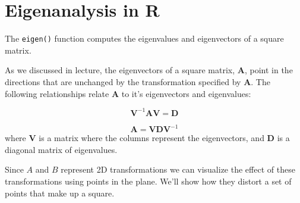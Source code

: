 \section{Eigenanalysis in R}

The \lstinline!eigen()! function computes the eigenvalues and
eigenvectors of a square matrix.

As we discussed in lecture, the eigenvectors of a square matrix,
$$, point in the directions that are unchanged by the
transformation specified by $$. The following relationships
relate $$ to it's eigenvectors and eigenvalues:

\[\mathbf{V}^{-1}\mathbf{A}\mathbf{V}  =  \mathbf{D} \]

\[\mathbf{A}  =  \mathbf{V}\mathbf{D}\mathbf{V}^{-1}\]
%
where $$ is a matrix where the columns represent the eigenvectors, and $$ is a diagonal matrix of eigenvalues.

Since $A$ and $B$ represent 2D transformations we can visualize the
effect of these transformations using points in the plane. We'll show
how they distort a set of points that make up a square.

